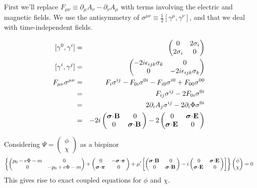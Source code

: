 First we'll replace $F_{\mu\nu} \equiv \partial_\mu A_\nu - \partial_\nu A_\mu$ with terms involving the electric and magnetic fields.  We use the antisymmetry of $\sigma^{\mu\nu} \equiv \frac{1}{2}[\gamma^\mu, \gamma^\nu]$, and that we deal with time-independent fields.

\begin{eqnarray*}
	  {[\gamma^0, \gamma^i]}
		&=&  \begin{pmatrix}	0 & 2\sigma_i \\ 2\sigma_i & 0\end{pmatrix}	\\
	  {[\gamma^i, \gamma^j ]}
		&=&	 \begin{pmatrix}	-2i\epsilon_{ijk}\sigma_k & 0 \\ 0 & -2i\epsilon_{ijk}\sigma_k\end{pmatrix}	\\
	F_{\mu\nu} \sigma^{\mu\nu} &=& F_{i}\sigma^{ij} - F_{0i}\sigma^{0i} 	- F_{i0}\sigma^{i0} +F_{00}\sigma^{00}	\\
		&=&	F_{ij} \sigma^{ij} -2F_{0i} \sigma^{0i}	\\
		&=&	2 \partial_i A_j \sigma^{ij} - 2\partial_i \Phi \sigma^{0i}	\\
		&=&	-2i \begin{pmatrix} \mbox{\boldmath$ \sigma $} \hspace{-2pt} \cdot \hspace{-2pt} \mathbf{B} \, & 0 \\ 0 & \mbox{\boldmath$ \sigma $} \hspace{-2pt} \cdot \hspace{-2pt} \mathbf{B} \,\end{pmatrix}	
			-2 \begin{pmatrix} 0 & \mbox{\boldmath$ \sigma $} \hspace{-2pt} \cdot \hspace{-2pt} \mathbf{E} \, \\ \mbox{\boldmath$ \sigma $} \hspace{-2pt} \cdot \hspace{-2pt} \mathbf{E} \, & 0 \end{pmatrix}	
\end{eqnarray*}





Considering $\Psi = \begin{pmatrix} \phi \\ \chi \end{pmatrix}$ as a bispinor
\[
	\left\{
		\begin{pmatrix}
			p_0 - e\Phi	- m &	0	\\
			0	&	-p_0 + e\Phi - m	\\
		\end{pmatrix}
		+
		\begin{pmatrix}	0 & -\sigdotg{\pi} \\  \sigdotg{\pi} & 0 \end{pmatrix} 
		+\mu'\left [
			\begin{pmatrix}
				\sigdot{B} & 0 \\ 0 & \sigdot{B}
			\end{pmatrix}
			-i \begin{pmatrix}
				0 & \sigdot{E} \\ \sigdot{E} & 0
			\end{pmatrix}
		\right ] 
	\right\} \begin{pmatrix} \phi \\ \chi \end{pmatrix}
		= 0
\]
This gives rise to exact coupled equations for $\phi$ and $\chi$.

